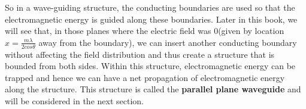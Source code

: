 So in a wave-guiding structure, the conducting boundaries are used so that the electromagnetic energy is guided along these boundaries. Later in this book, we will see that, in those planes where the electric field was $0$(given by location $x = \frac{m\lambda}{2cos\theta}$ away from the boundary), we can insert another conducting boundary without affecting the field distribution and thus create a structure that is bounded from both sides. Within this structure, electromagnetic energy can be trapped and hence we can have a net propagation of electromagnetic energy along the structure. This structure is called the \textbf{parallel plane waveguide}  and will be considered in the next section.
